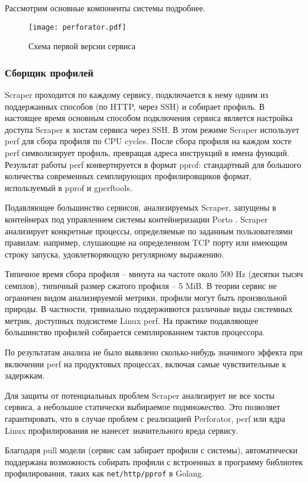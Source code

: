 Рассмотрим основные компоненты системы подробнее.

\begin{figure}[H]
	\centering
	\texttt{[image: perforator.pdf]}
	\caption{Схема первой версии сервиса}
    \label{fig:simple}
\end{figure}

\subsubsection{Сборщик профилей}
Scraper проходится по каждому сервису, подключается к нему одним из поддержанных способов (по HTTP, через SSH) и собирает профиль.
В настоящее время основным способом подключения сервиса является настройка доступа Scraper к хостам сервиса через SSH.
В этом режиме Scraper использует perf для сбора профиля по CPU cycles.
После сбора профиля на каждом хосте perf символизирует профиль, превращая адреса инструкций в имена функций.
Результат работы perf конвертируется в формат pprof: стандартный для большого количества современных семплирующих профилировщиков
формат, используемый в pprof и gperftools.

Подавляющее большинство сервисов, анализируемых Scraper, запущены в контейнерах под управлением системы контейнеризации Porto \cite{porto}.
Scraper анализирует конкретные процессы, определяемые по заданным пользователями правилам:
например, слушающие на определенном TCP порту или имеющим строку запуска, удовлетворяющую регулярному выражению.

Типичное время сбора профиля – минута на частоте около 500 Hz (десятки тысяч семплов), типичный размер сжатого профиля – 5 MiB.
В теории сервис не ограничен видом анализируемой метрики, профили могут быть произвольной природы.
В частности, тривиально поддерживются различные виды системных метрик, доступных подсистеме Linux perf.
На практике подавляющее большинство профилей собирается семплированием тактов процессора.

По результатам анализа не было выявлено сколько-нибудь значимого эффекта при включении perf на продуктовых процессах,
включая самые чувствительные к задержкам.

Для защиты от потенциальных проблем Scraper анализирует не все хосты сервиса, а небольшое статически выбираемое подмножество.
Это позволяет гарантировать, что в случае проблем с реализацией Perforator, perf или ядра Linux профилирования не нанесет значительного
вреда сервису.

Благодаря pull модели (сервис сам забирает профили с системы), автоматически поддержана возможность собирать профили с встроенных
в программу библиотек профилирования, таких как \lstinline!net/http/pprof! \cite{golang:pprof} в Golang.

